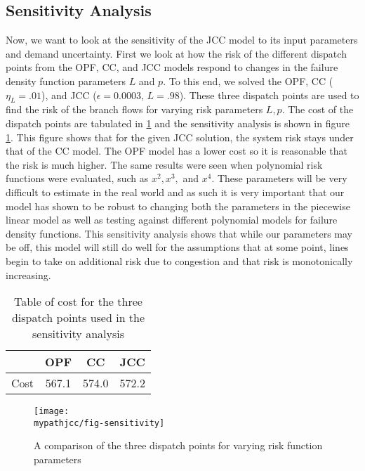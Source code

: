 \subsection{Sensitivity Analysis}\label{senseanal}
Now, we want to look at the sensitivity of the JCC model to its input parameters and demand uncertainty.  First we look at how the risk of the different dispatch points from the OPF, CC, and JCC models respond to changes in the failure density function parameters $L$ and $p$.  To this end, we solved the OPF, CC ($\eta_L=.01$), and JCC ($\epsilon=0.0003$, $L=.98$).  These three dispatch points are used to find the risk of the branch flows for varying risk parameters $L,p$. The cost of the dispatch points are tabulated in \ref{tabsense} and the sensitivity analysis is shown in figure \ref{figsense}. This figure shows that for the given JCC solution, the system risk stays under that of the CC model.  The OPF model has a lower cost so it is reasonable that the risk is much higher.  The same results were seen when polynomial risk functions were evaluated, such as $x^2,x^3,$ and $x^4$.  These parameters will be very difficult to estimate in the real world and as such it is very important that our model has shown to be robust to changing both the parameters in the piecewise linear model as well as testing against different polynomial models for failure density functions.  This sensitivity analysis shows that while our parameters may be off, this model will still do well for the assumptions that at some point, lines begin to take on additional risk due to congestion and that risk is monotonically increasing.

\begin{table}
\centering
 \begin{tabular}{ |c| c c c |}
\hline
& OPF & CC & JCC \\
\hline
\hline
Cost & 567.1 & 574.0 & 572.2\\
\hline
\end{tabular}
\caption{Table of cost for the three dispatch points used in the sensitivity analysis}\label{tabsense}
\end{table}


\begin{figure}
\centering
\texttt{[image: \\mypathjcc/fig-sensitivity]}
\caption{A comparison of the three dispatch points for varying risk function parameters}\label{figsense}
\end{figure}






